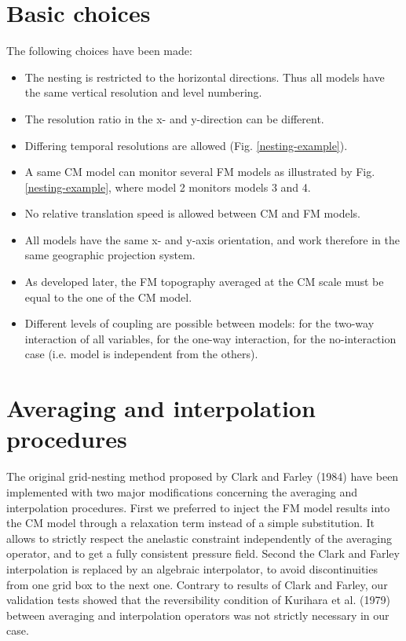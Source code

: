 \section{Basic choices}

The following choices have been made:

\begin{itemize}
\item The nesting is restricted to the horizontal directions. Thus all models
have the same vertical resolution and level numbering.
\item The resolution ratio in the x- and y-direction can be different.
\item Differing temporal resolutions are allowed (Fig. \ref{nesting-example}).
\item A same CM model can monitor several FM models as illustrated by
Fig. \ref{nesting-example}, where model 2 monitors models 3 and 4.
\item No relative translation speed is allowed between CM and FM models.
\item All models have the same x- and y-axis orientation, and work therefore
in the same geographic projection system.
\item As developed later, the FM topography averaged at the CM scale must be
equal to the one of the CM model.
\item Different levels of coupling are possible between models:
 for the two-way interaction of all variables,
 for the one-way interaction,
 for the no-interaction case (i.e. model is independent
from the others).
\end{itemize}

\section{Averaging and interpolation procedures}

The original grid-nesting method proposed by Clark and Farley (1984)
have been implemented with two major modifications concerning the
averaging and interpolation procedures. First we preferred to inject the FM
model results into the CM model through a relaxation term instead of a
simple substitution. It allows to strictly respect the anelastic constraint
independently of the averaging operator, and to get a fully consistent pressure
field. Second the Clark and Farley interpolation is replaced by an
algebraic interpolator, to avoid discontinuities from one grid box to the next
one. Contrary to results of Clark and Farley, our validation tests showed that
the reversibility condition of Kurihara et al. (1979) between averaging and
interpolation operators was not strictly necessary in our case.

